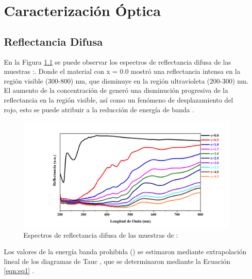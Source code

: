 \chapter{Caracterización Óptica}
\section{Reflectancia Difusa}

En la Figura \ref{fig:reflectancia} se puede observar los espectros de
reflectancia difusa de las muestras :.
Donde el material con x = 0.0 mostró una reflectancia intensa en la región
visible (300-800) nm, que disminuye en la región ultravioleta (200-300) nm.  El
aumento de la
concentración de  generó una disminución progresiva de la
reflectancia en
la región visible, así como un fenómeno de desplazamiento del rojo, esto se
puede atribuir a la reducción de energía de banda \cite{Zhou2017}.\\

\begin{figure}[h]
    \centering%

    \includegraphics[width=\textwidth]{Kap4/ReflectanciaDifusa.png}%
    \caption{Espectros de reflectancia difusa de las muestras de
    :} \label{fig:reflectancia}
\end{figure}

Los valores de la energía banda prohibida () se estimaron mediante
extrapolación
lineal de los diagramas de Tauc \cite{Deng2013}, que se determinaron mediante
la Ecuación \ref{eqn:eq1} \cite{Mott1970}.\\

\begin{equation}
    [(F(R) h \nu)^{n}=A(h \nu - E_{g})]
    \label{eqn:eq1}
\end{equation}

